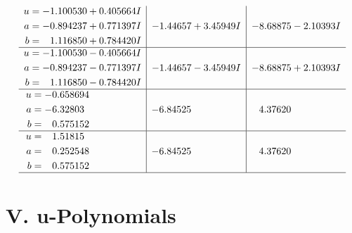 \documentclass[1p]{elsarticle_modified}
\theoremstyle{definition}
\begin{document}
$$\begin{array}{c|c|c}
\begin{aligned}
u &= -1.100530 + 0.405664 I \\
a &= -0.894237 + 0.771397 I \\
b &= \phantom{-}1.116850 + 0.784420 I\end{aligned}
 & -1.44657 + 3.45949 I & -8.68875 - 2.10393 I \\ \hline\begin{aligned}
u &= -1.100530 - 0.405664 I \\
a &= -0.894237 - 0.771397 I \\
b &= \phantom{-}1.116850 - 0.784420 I\end{aligned}
 & -1.44657 - 3.45949 I & -8.68875 + 2.10393 I \\ \hline\begin{aligned}
u &= -0.658694\phantom{ +0.000000I} \\
a &= -6.32803\phantom{ +0.000000I} \\
b &= \phantom{-}0.575152\phantom{ +0.000000I}\end{aligned}
 & -6.84525\phantom{ +0.000000I} & \phantom{-}4.37620\phantom{ +0.000000I} \\ \hline\begin{aligned}
u &= \phantom{-}1.51815\phantom{ +0.000000I} \\
a &= \phantom{-}0.252548\phantom{ +0.000000I} \\
b &= \phantom{-}0.575152\phantom{ +0.000000I}\end{aligned}
 & -6.84525\phantom{ +0.000000I} & \phantom{-}4.37620\phantom{ +0.000000I}\\
 \hline 
 \end{array}$$\newpage
\newpage\renewcommand{\arraystretch}{1}
\centering \section*{ V. u-Polynomials}
\end{document}
